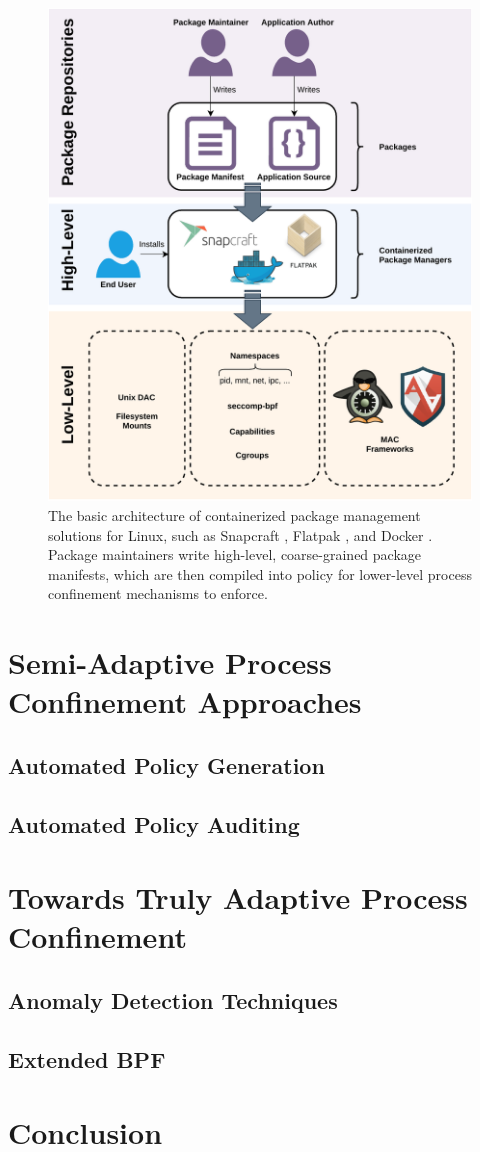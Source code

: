 \documentclass[dvipsnames, 12pt]{article}
\begin{document}
\begin{figure}[htpb]
    \centering
    \includegraphics[width=0.6\linewidth]{figs/high-level.pdf}
    \caption{
        The basic architecture of containerized package management solutions for
        Linux, such as Snapcraft \cite{snap}, Flatpak \cite{flatpak}, and Docker
        \cite{docker}. Package maintainers write high-level, coarse-grained
        package manifests, which are then compiled into policy for lower-level
        process confinement mechanisms to enforce.
    }%
    \label{fig:containerized}
\end{figure}

\section{Semi-Adaptive Process Confinement Approaches}
\label{sec:semi-adaptive}

\subsection{Automated Policy Generation}

\subsection{Automated Policy Auditing}

\section{Towards Truly Adaptive Process Confinement}
\label{sec:towards}

\subsection{Anomaly Detection Techniques}

\subsection{Extended BPF}

\section{Conclusion}
\label{sec:conclusion}


\clearpage
\printbibliography
\end{document}
